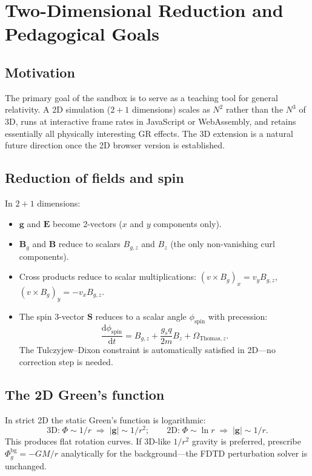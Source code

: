 \documentclass[11pt,a4paper]{article}
\newcommand{\vv}[1]{\mathbf{#1}}
\newcommand{\Phig}{\Phi_g}
\newcommand{\dd}{\mathrm{d}}
\begin{document}
\section{Two-Dimensional Reduction and Pedagogical Goals}

\subsection{Motivation}

The primary goal of the sandbox is to serve as a teaching tool for general relativity.  A 2D simulation ($2+1$ dimensions) scales as $N^2$ rather than the $N^3$ of 3D, runs at interactive frame rates in JavaScript or WebAssembly, and retains essentially all physically interesting GR effects.  The 3D extension is a natural future direction once the 2D browser version is established.

\subsection{Reduction of fields and spin}

In $2+1$ dimensions:
\begin{itemize}
  \item $\vv{g}$ and $\vv{E}$ become 2-vectors ($x$ and $y$ components only).
  \item $\vv{B}_g$ and $\vv{B}$ reduce to scalars $B_{g,z}$ and $B_z$ (the only non-vanishing curl components).
  \item Cross products reduce to scalar multiplications: $(v\times B_g)_x = v_y B_{g,z}$, $(v\times B_g)_y = -v_x B_{g,z}$.
  \item The spin 3-vector $\vv{S}$ reduces to a scalar angle $\phi_{\mathrm{spin}}$ with precession:
  \begin{equation}
    \frac{\dd\phi_{\mathrm{spin}}}{\dd t} = B_{g,z} + \frac{g_s q}{2m}B_z + \Omega_{\mathrm{Thomas},z}.
  \end{equation}
  The Tulczyjew--Dixon constraint is automatically satisfied in 2D---no correction step is needed.
\end{itemize}

\subsection{The 2D Green's function}

In strict 2D the static Green's function is logarithmic:
\begin{equation}
  \text{3D:}\; \Phi\sim 1/r \;\Rightarrow\; |\vv{g}|\sim 1/r^2; \qquad
  \text{2D:}\; \Phi\sim \ln r \;\Rightarrow\; |\vv{g}|\sim 1/r.
\end{equation}
This produces flat rotation curves.  If 3D-like $1/r^2$ gravity is preferred, prescribe $\Phig^{\mathrm{bg}} = -GM/r$ analytically for the background---the FDTD perturbation solver is unchanged.
\end{document}
